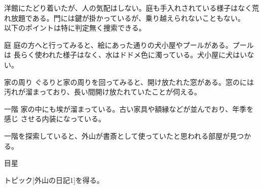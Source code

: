 \documentclass[a4paper,8pt,min]{jsarticle}
\begin{document}
洋館にたどり着いたが、人の気配はしない。庭も手入れされている様子はなく荒
れ放題である。門には鍵が掛かっているが、乗り越えられないこともない。\\

以下のポイントは特に判定無く捜索できる。
\begin{topic}
 \item[庭]
 庭の方へと行ってみると、絵にあった通りの犬小屋やプールがある。プールは
 長らく使われた様子はなく、水はドドメ色に濁っている。犬小屋に犬はいない。

 \item[家の周り]
 ぐるりと家の周りを回ってみると、開け放たれた窓がある。窓のには汚れが溜まっており、長い間開け放たれていたことが伺える。

 \item[一階]
 家の中にも埃が溜まっている。古い家具や額縁などが並んでおり、年季を感じ
 させる内装になっている。
\end{topic}

一階を探索していると、外山が書斎として使っていたと思われる部屋が見つかる。
\begin{judge}{目星}
 \item トピック[外山の日記1]を得る。
\end{judge}
\end{document}
